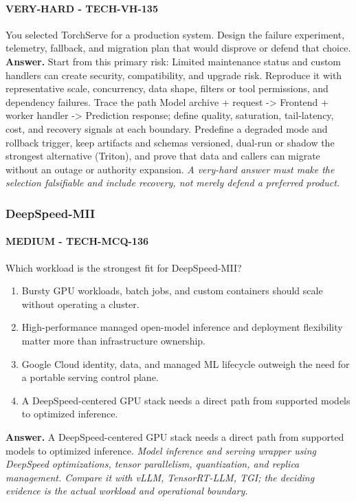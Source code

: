 \paragraph{VERY-HARD - TECH-VH-135} You selected TorchServe for a production system. Design the failure experiment, telemetry, fallback, and migration plan that would disprove or defend that choice.
\textbf{Answer.} Start from this primary risk: Limited maintenance status and custom handlers can create security, compatibility, and upgrade risk. Reproduce it with representative scale, concurrency, data shape, filters or tool permissions, and dependency failures. Trace the path Model archive + request -> Frontend + worker handler -> Prediction response; define quality, saturation, tail-latency, cost, and recovery signals at each boundary. Predefine a degraded mode and rollback trigger, keep artifacts and schemas versioned, dual-run or shadow the strongest alternative (Triton), and prove that data and callers can migrate without an outage or authority expansion.
\textit{A very-hard answer must make the selection falsifiable and include recovery, not merely defend a preferred product.}
\subsubsection*{DeepSpeed-MII}
\paragraph{MEDIUM - TECH-MCQ-136} Which workload is the strongest fit for DeepSpeed-MII?
\begin{enumerate}[label=\Alph*.]
\item Bursty GPU workloads, batch jobs, and custom containers should scale without operating a cluster.
\item High-performance managed open-model inference and deployment flexibility matter more than infrastructure ownership.
\item Google Cloud identity, data, and managed ML lifecycle outweigh the need for a portable serving control plane.
\item A DeepSpeed-centered GPU stack needs a direct path from supported models to optimized inference.
\end{enumerate}
\textbf{Answer.} A DeepSpeed-centered GPU stack needs a direct path from supported models to optimized inference.
\textit{Model inference and serving wrapper using DeepSpeed optimizations, tensor parallelism, quantization, and replica management. Compare it with vLLM, TensorRT-LLM, TGI; the deciding evidence is the actual workload and operational boundary.}
